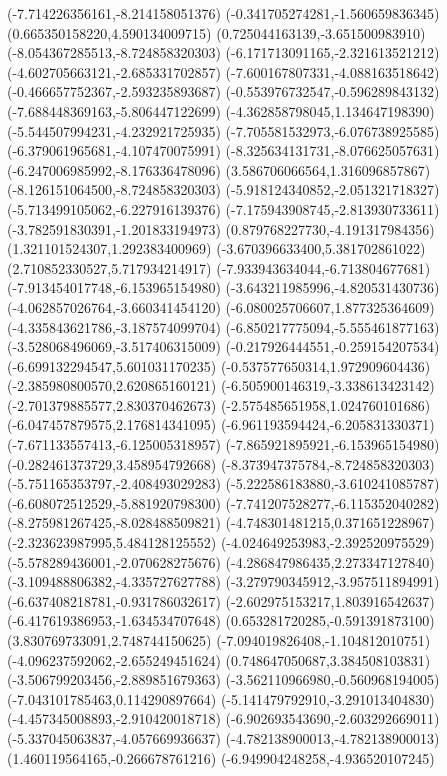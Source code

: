 {(-7.714226356161,-8.214158051376)
(-0.341705274281,-1.560659836345)
(0.665350158220,4.590134009715)
(0.725044163139,-3.651500983910)
(-8.054367285513,-8.724858320303)
(-6.171713091165,-2.321613521212)
(-4.602705663121,-2.685331702857)
(-7.600167807331,-4.088163518642)
(-0.466657752367,-2.593235893687)
(-0.553976732547,-0.596289843132)
(-7.688448369163,-5.806447122699)
(-4.362858798045,1.134647198390)
(-5.544507994231,-4.232921725935)
(-7.705581532973,-6.076738925585)
(-6.379061965681,-4.107470075991)
(-8.325634131731,-8.076625057631)
(-6.247006985992,-8.176336478096)
(3.586706066564,1.316096857867)
(-8.126151064500,-8.724858320303)
(-5.918124340852,-2.051321718327)
(-5.713499105062,-6.227916139376)
(-7.175943908745,-2.813930733611)
(-3.782591830391,-1.201833194973)
(0.879768227730,-4.191317984356)
(1.321101524307,1.292383400969)
(-3.670396633400,5.381702861022)
(2.710852330527,5.717934214917)
(-7.933943634044,-6.713804677681)
(-7.913454017748,-6.153965154980)
(-3.643211985996,-4.820531430736)
(-4.062857026764,-3.660341454120)
(-6.080025706607,1.877325364609)
(-4.335843621786,-3.187574099704)
(-6.850217775094,-5.555461877163)
(-3.528068496069,-3.517406315009)
(-0.217926444551,-0.259154207534)
(-6.699132294547,5.601031170235)
(-0.537577650314,1.972909604436)
(-2.385980800570,2.620865160121)
(-6.505900146319,-3.338613423142)
(-2.701379885577,2.830370462673)
(-2.575485651958,1.024760101686)
(-6.047457879575,2.176814341095)
(-6.961193594424,-6.205831330371)
(-7.671133557413,-6.125005318957)
(-7.865921895921,-6.153965154980)
(-0.282461373729,3.458954792668)
(-8.373947375784,-8.724858320303)
(-5.751165353797,-2.408493029283)
(-5.222586183880,-3.610241085787)
(-6.608072512529,-5.881920798300)
(-7.741207528277,-6.115352040282)
(-8.275981267425,-8.028488509821)
(-4.748301481215,0.371651228967)
(-2.323623987995,5.484128125552)
(-4.024649253983,-2.392520975529)
(-5.578289436001,-2.070628275676)
(-4.286847986435,2.273347127840)
(-3.109488806382,-4.335727627788)
(-3.279790345912,-3.957511894991)
(-6.637408218781,-0.931786032617)
(-2.602975153217,1.803916542637)
(-6.417619386953,-1.634534707648)
(0.653281720285,-0.591391873100)
(3.830769733091,2.748744150625)
(-7.094019826408,-1.104812010751)
(-4.096237592062,-2.655249451624)
(0.748647050687,3.384508103831)
(-3.506799203456,-2.889851679363)
(-3.562110966980,-0.560968194005)
(-7.043101785463,0.114290897664)
(-5.141479792910,-3.291013404830)
(-4.457345008893,-2.910420018718)
(-6.902693543690,-2.603292669011)
(-5.337045063837,-4.057669936637)
(-4.782138900013,-4.782138900013)
(1.460119564165,-0.266678761216)
(-6.949904248258,-4.936520107245)
}
